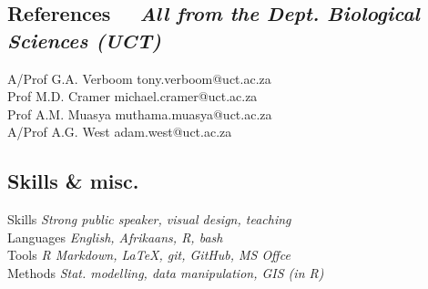\documentclass[10pt]{article}
\begin{document}
\hrulefill

\begin{multicols}{2}

\subsection*{References %
  ~~{\small \textmd{\textit{All from the Dept. Biological Sciences (UCT)}}}}

A/Prof G.A. Verboom                           \hfill   tony.verboom@uct.ac.za \\
Prof M.D. Cramer                              \hfill michael.cramer@uct.ac.za \\
Prof A.M. Muasya                              \hfill muthama.muasya@uct.ac.za \\
A/Prof A.G. West                              \hfill      adam.west@uct.ac.za

\columnbreak

\subsection*{Skills \& misc.} %


Skills         \hfill \textit{Strong public speaker, visual design, teaching} \\
Languages      \hfill \textit{                   English, Afrikaans, R, bash} \\
Tools          \hfill \textit{      R Markdown, LaTeX, git, GitHub, MS Offce} \\
Methods        \hfill \textit{Stat. modelling, data manipulation, GIS (in R)}

\end{multicols}
\end{document}
